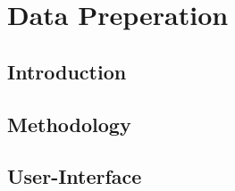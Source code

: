 \chapter{Data Preperation}

\section{Introduction}


\section{Methodology}

\section{User-Interface}